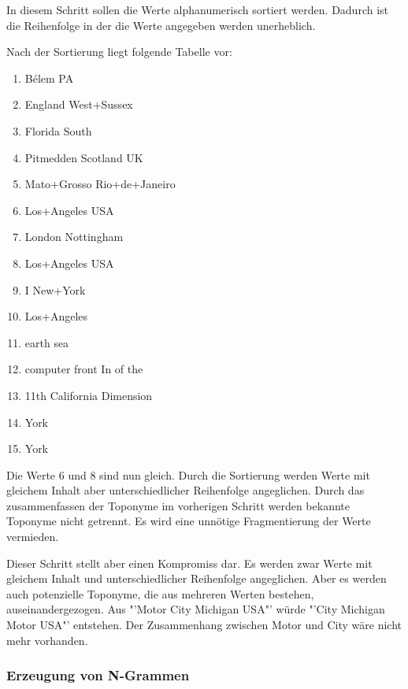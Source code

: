 				In diesem Schritt sollen die Werte alphanumerisch sortiert werden. 
				Dadurch ist die Reihenfolge in der die Werte angegeben werden unerheblich.

				Nach der Sortierung liegt folgende Tabelle vor:

				\begin{multicols}{2}
					\begin{enumerate}
						\item Bélem PA
						\item England West+Sussex
						\item Florida South
						\item Pitmedden Scotland UK
						\item Mato+Grosso Rio+de+Janeiro
						\item Los+Angeles USA
						\item London Nottingham
						\item Los+Angeles USA
						\item I New+York 
						\item Los+Angeles
						\item earth sea
						\item computer front In of the 
						\item 11th California Dimension 
						\item York
						\item York
					\end{enumerate}
				\end{multicols}

				Die Werte 6 und 8 sind nun gleich. 
				Durch die Sortierung werden Werte mit gleichem Inhalt aber unterschiedlicher Reihenfolge angeglichen.
				Durch das zusammenfassen der Toponyme im vorherigen Schritt werden bekannte Toponyme nicht getrennt.
				Es wird eine unnötige Fragmentierung der Werte vermieden.

				Dieser Schritt stellt aber einen Kompromiss dar.
				Es werden zwar Werte mit gleichem Inhalt und unterschiedlicher Reihenfolge angeglichen.
				Aber es werden auch potenzielle Toponyme, die aus mehreren Werten bestehen, auseinandergezogen.
				Aus "'Motor City Michigan USA"' würde "'City Michigan Motor USA"' entstehen.
				Der Zusammenhang zwischen Motor und City wäre nicht mehr vorhanden.  

			\subsubsection{Erzeugung von N-Grammen}

